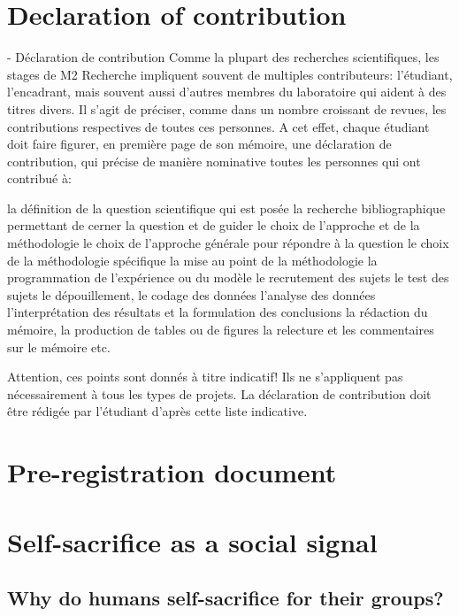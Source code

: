 \documentclass[a4paper,12pt]{report}
\begin{document}
\part{Declaration of contribution}
- Déclaration de contribution
Comme la plupart des recherches scientifiques, les stages de M2 Recherche impliquent souvent de multiples contributeurs: l'étudiant, l'encadrant, mais souvent aussi d'autres membres du laboratoire qui aident à des titres divers. Il s'agit de préciser, comme dans un nombre croissant de revues, les contributions respectives de toutes ces personnes. A cet effet, chaque étudiant doit faire figurer, en première page de son mémoire, une déclaration de contribution, qui précise de manière nominative toutes les personnes qui ont contribué à:

        la définition de la question scientifique qui est posée
        la recherche bibliographique permettant de cerner la question et de guider le choix de l'approche et de la méthodologie
        le choix de l'approche générale pour répondre à la question
        le choix de la méthodologie spécifique
        la mise au point de la méthodologie
        la programmation de l'expérience ou du modèle
        le recrutement des sujets
        le test des sujets
        le dépouillement, le codage des données
        l'analyse des données
        l'interprétation des résultats et la formulation des conclusions
        la rédaction du mémoire, la production de tables ou de figures
        la relecture et les commentaires sur le mémoire
        etc.

Attention, ces points sont donnés à titre indicatif! Ils ne s'appliquent pas nécessairement à tous les types de projets. La déclaration de contribution doit être rédigée par l’étudiant d’après cette liste indicative.


\part{Pre-registration document}

\part{Self-sacrifice as a social signal}

\chapter{Why do humans self-sacrifice for their groups?}
\end{document}
